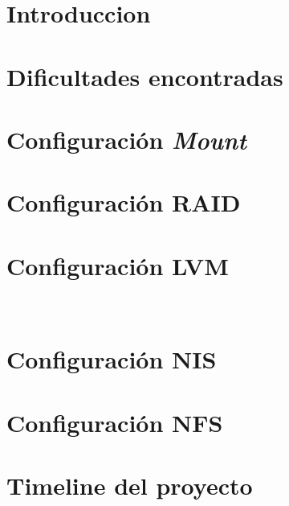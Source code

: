 \documentclass[12pt, spanish, a4paper, hidelinks]{article}
\begin{document}
    \maketitle

    \tableofcontents

    \newpage
    \section{Introduccion}
    

    \newpage
    \section{Dificultades encontradas}
    
    
    \newpage
    \section{Configuración \textit{Mount}}
    

    \newpage
    \section{Configuración RAID}
    
    
    \newpage
    \section{Configuración LVM}
    
    
    \newpage 
    \section{Configuración NIS}
    
    
    \newpage
    \section{Configuración NFS}
    


    \newpage
    \section{Timeline del proyecto}
    

    \newpage
    \printbibliography[
        heading=bibintoc,
        title={Bibliografía}
    ]
\end{document}
